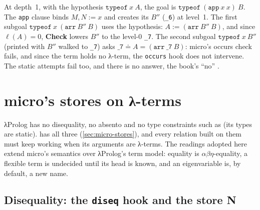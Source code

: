 \begin{tutorial}
At depth~1, with the hypothesis $\mathtt{typeof}\ x\ A$, the goal is
$\mathtt{typeof}\ (\mathtt{app}\ x\ x)\ B$. The \texttt{app} clause binds $M,N := x$ and creates its $B''$
(\texttt{\_6}) at level~1. The first subgoal $\mathtt{typeof}\ x\ (\mathtt{arr}\ B''\ B)$ uses the hypothesis:
$A := (\mathtt{arr}\ B''\ B)$, and since $\ell(A)=0$, \textbf{Check} lowers $B''$ to the level-0
\texttt{\_7}. The second subgoal $\mathtt{typeof}\ x\ B''$ (printed with $B''$ walked to \texttt{\_7}) asks
$\mathtt{\_7} \doteq A = (\mathtt{arr}\ \mathtt{\_7}\ B)$: micro's occurs check fails, and since the term holds
no λ-term, the \texttt{occurs} hook does not intervene. The static attempts fail too, and there is no answer,
the book's \enquote{no} .
\end{tutorial}

\section{micro's stores on λ-terms}\label{sec:module-stores}

λProlog has no disequality, no absento and no type constraints such as  (its types are
static). \micro{} has all three (\cref{sec:micro-stores}), and
every relation built on them must keep working when its arguments are λ-terms. The readings adopted here extend
micro's semantics over λProlog's term model: equality is $\alpha\beta\eta$-equality, a flexible term is
undecided until its head is known, and an eigenvariable is, by default, a new name.

\subsection{Disequality: the \texorpdfstring{\texttt{diseq}}{diseq} hook and the store N}

